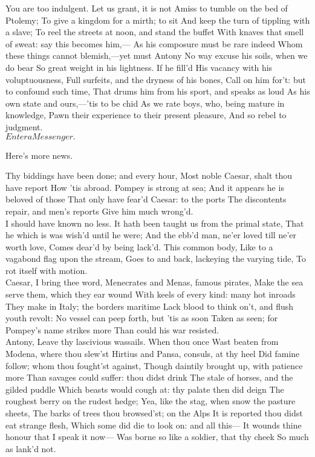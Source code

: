 \documentclass{book}
\begin{document}
\3	You are too indulgent. Let us grant, it is not
	Amiss to tumble on the bed of Ptolemy;
	To give a kingdom for a mirth; to sit
	And keep the turn of tippling with a slave;
	To reel the streets at noon, and stand the buffet
	With knaves that smell of sweat: say this becomes him,---
	As his composure must be rare indeed
	Whom these things cannot blemish,---yet must Antony
	No way excuse his soils, when we do bear
	So great weight in his lightness. If he fill'd
	His vacancy with his voluptuousness,
	Full surfeits, and the dryness of his bones,
	Call on him for't: but to confound such time,
	That drums him from his sport, and speaks as loud
	As his own state and ours,---'tis to be chid
	As we rate boys, who, being mature in knowledge,
	Pawn their experience to their present pleasure,
	And so rebel to judgment. \\

	\(Enter a Messenger.\)

	Here's more news.

	Thy biddings have been done; and every hour,
	Most noble Caesar, shalt thou have report
	How 'tis abroad. Pompey is strong at sea;
	And it appears he is beloved of those
	That only have fear'd Caesar: to the ports
	The discontents repair, and men's reports
	Give him much wrong'd. \\

\3	I should have known no less.
	It hath been taught us from the primal state,
	That he which is was wish'd until he were;
	And the ebb'd man, ne'er loved till ne'er worth love,
	Comes dear'd by being lack'd. This common body,
	Like to a vagabond flag upon the stream,
	Goes to and back, lackeying the varying tide,
	To rot itself with motion. \\

	Caesar, I bring thee word,
	Menecrates and Menas, famous pirates,
	Make the sea serve them, which they ear wound
	With keels of every kind: many hot inroads
	They make in Italy; the borders maritime
	Lack blood to think on't, and flush youth revolt:
	No vessel can peep forth, but 'tis as soon
	Taken as seen; for Pompey's name strikes more
	Than could his war resisted. \\

\3	Antony,
	Leave thy lascivious wassails. When thou once
	Wast beaten from Modena, where thou slew'st
	Hirtius and Pansa, consuls, at thy heel
	Did famine follow; whom thou fought'st against,
	Though daintily brought up, with patience more
	Than savages could suffer: thou didst drink
	The stale of horses, and the gilded puddle
	Which beasts would cough at: thy palate then did deign
	The roughest berry on the rudest hedge;
	Yea, like the stag, when snow the pasture sheets,
	The barks of trees thou browsed'st; on the Alps
	It is reported thou didst eat strange flesh, 
	Which some did die to look on: and all this---
	It wounds thine honour that I speak it now---
	Was borne so like a soldier, that thy cheek
	So much as lank'd not. \\
\end{document}

